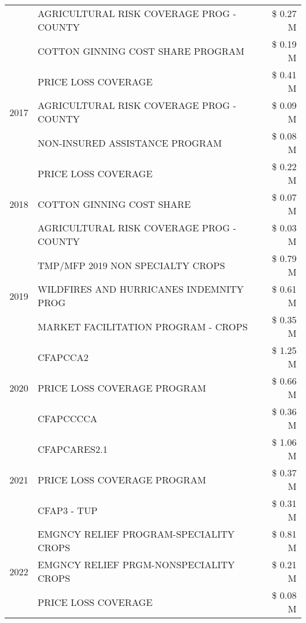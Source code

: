 \begin{tabular}{llr}
 & AGRICULTURAL RISK COVERAGE PROG - COUNTY & \$ 0.27 M \\
 & COTTON GINNING COST SHARE PROGRAM & \$ 0.19 M \\
\cline{1-3}
\multirow[t]{3}{*}{2017} & PRICE LOSS COVERAGE & \$ 0.41 M \\
 & AGRICULTURAL RISK COVERAGE PROG - COUNTY & \$ 0.09 M \\
 & NON-INSURED ASSISTANCE PROGRAM & \$ 0.08 M \\
\cline{1-3}
\multirow[t]{3}{*}{2018} & PRICE LOSS COVERAGE & \$ 0.22 M \\
 & COTTON GINNING COST SHARE & \$ 0.07 M \\
 & AGRICULTURAL RISK COVERAGE PROG - COUNTY & \$ 0.03 M \\
\cline{1-3}
\multirow[t]{3}{*}{2019} & TMP/MFP 2019 NON SPECIALTY CROPS & \$ 0.79 M \\
 & WILDFIRES AND HURRICANES INDEMNITY PROG & \$ 0.61 M \\
 & MARKET FACILITATION PROGRAM - CROPS & \$ 0.35 M \\
\cline{1-3}
\multirow[t]{3}{*}{2020} & CFAPCCA2 & \$ 1.25 M \\
 & PRICE LOSS COVERAGE PROGRAM & \$ 0.66 M \\
 & CFAPCCCCA & \$ 0.36 M \\
\cline{1-3}
\multirow[t]{3}{*}{2021} & CFAPCARES2.1 & \$ 1.06 M \\
 & PRICE LOSS COVERAGE PROGRAM & \$ 0.37 M \\
 & CFAP3 - TUP & \$ 0.31 M \\
\cline{1-3}
\multirow[t]{3}{*}{2022} & EMGNCY RELIEF PROGRAM-SPECIALITY CROPS & \$ 0.81 M \\
 & EMGNCY RELIEF PRGM-NONSPECIALITY CROPS & \$ 0.21 M \\
 & PRICE LOSS COVERAGE & \$ 0.08 M \\
\cline{1-3}
\bottomrule
\end{tabular}
